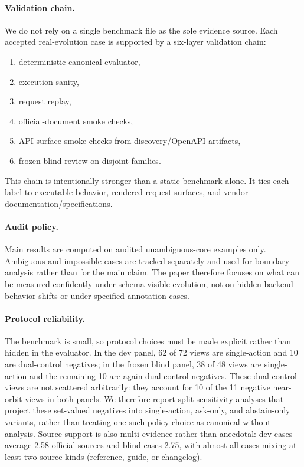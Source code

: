 \paragraph{Validation chain.}
We do not rely on a single benchmark file as the sole evidence source. Each accepted real-evolution case is supported by a six-layer validation chain:
\begin{enumerate}[leftmargin=1.5em]
    \item deterministic canonical evaluator,
    \item execution sanity,
    \item request replay,
    \item official-document smoke checks,
    \item API-surface smoke checks from discovery/OpenAPI artifacts,
    \item frozen blind review on disjoint families.
\end{enumerate}
This chain is intentionally stronger than a static benchmark alone. It ties each label to executable behavior, rendered request surfaces, and vendor documentation/specifications.

\paragraph{Audit policy.}
Main results are computed on audited unambiguous-core examples only. Ambiguous and impossible cases are tracked separately and used for boundary analysis rather than for the main claim. The paper therefore focuses on what can be measured confidently under schema-visible evolution, not on hidden backend behavior shifts or under-specified annotation cases.

\paragraph{Protocol reliability.}
The benchmark is small, so protocol choices must be made explicit rather than hidden in the evaluator. In the dev panel, 62 of 72 views are single-action and 10 are dual-control negatives; in the frozen blind panel, 38 of 48 views are single-action and the remaining 10 are again dual-control negatives. These dual-control views are not scattered arbitrarily: they account for 10 of the 11 negative near-orbit views in both panels. We therefore report split-sensitivity analyses that project these set-valued negatives into single-action, ask-only, and abstain-only variants, rather than treating one such policy choice as canonical without analysis. Source support is also multi-evidence rather than anecdotal: dev cases average 2.58 official sources and blind cases 2.75, with almost all cases mixing at least two source kinds (reference, guide, or changelog).
